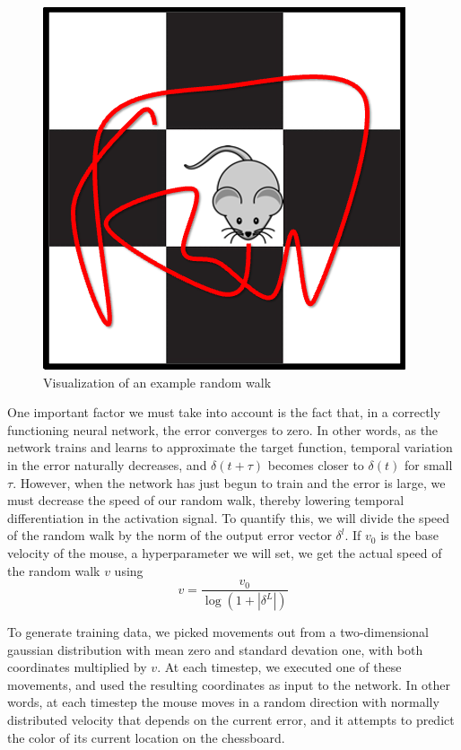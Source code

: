 \documentclass[12pt]{article}
\begin{document}
\begin{figure}
	\includegraphics[scale=0.4]{mouse_chessboard}\centering
	\caption{Visualization of an example random walk}
\end{figure}

One important factor we must take into account is the fact that, in a correctly functioning neural network, the error converges to zero. In other words, as the network trains and learns to approximate the target function, temporal variation in the error naturally decreases, and $\delta(t+\tau)$ becomes closer to $\delta(t)$ for small $\tau$. However, when the network has just begun to train and the error is large, we must decrease the speed of our random walk, thereby lowering temporal differentiation in the activation signal. To quantify this, we will divide the speed of the random walk by the norm of the output error vector $\delta^l$. If $v_0$ is the base velocity of the mouse, a hyperparameter we will set, we get the actual speed of the random walk $v$ using
\begin{equation}
	v = \frac{v_0}{\log(1+|\delta^L|)}
\end{equation}

To generate training data, we picked movements out from a two-dimensional gaussian distribution with mean zero and standard devation one, with both coordinates multiplied by $v$. At each timestep, we executed one of these movements, and used the resulting coordinates as input to the network. In other words, at each timestep the mouse moves in a random direction with normally distributed velocity that depends on the current error, and it attempts to predict the color of its current location on the chessboard.
\end{document}
